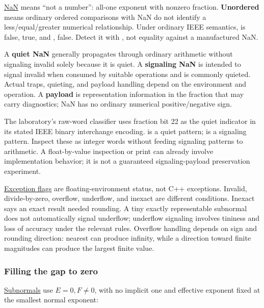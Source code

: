 \hyperref[appendix-d6607cc4c235]{NaN} means ``not a number'': all-one exponent with nonzero fraction. \textbf{Unordered} means ordinary ordered comparisons with NaN do not identify a less/equal/greater numerical relationship. Under ordinary IEEE semantics,  is false,  true, and ,  false. Detect it with , not equality against a manufactured NaN.

A \textbf{quiet NaN} generally propagates through ordinary arithmetic without signaling invalid solely because it is quiet. A \textbf{signaling NaN} is intended to signal invalid when consumed by suitable operations and is commonly quieted. Actual traps, quieting, and payload handling depend on the environment and operation. A \textbf{payload} is representation information in the fraction that may carry diagnostics; NaN has no ordinary numerical positive/negative sign.

The laboratory's raw-word classifier uses fraction bit 22 as the quiet indicator in its stated IEEE binary interchange encoding.  is a quiet pattern;  is a signaling pattern. Inspect these as integer words without feeding signaling patterns to arithmetic. A float-by-value inspection or print can already involve implementation behavior; it is not a guaranteed signaling-payload preservation experiment.

\hyperref[appendix-ed8531b46754]{Exception flags} are floating-environment status, not C++  exceptions. Invalid, divide-by-zero, overflow, underflow, and inexact are different conditions. Inexact says an exact result needed rounding. A tiny exactly representable subnormal does not automatically signal underflow; underflow signaling involves tininess and loss of accuracy under the relevant rules. Overflow handling depends on sign and rounding direction: nearest can produce infinity, while a direction toward finite magnitudes can produce the largest finite value.

\subsubsection{Filling the gap to zero}\label{01-foundations-i-ch001-filling-the-gap-to-zero}

\hypertarget{01-foundations-i-ch001-filling-the-gap-to-zero}{}

\hyperref[appendix-00a6e044c437]{Subnormals} use \(E=0,F\ne0\), with no implicit one and effective exponent fixed at the smallest normal exponent:

